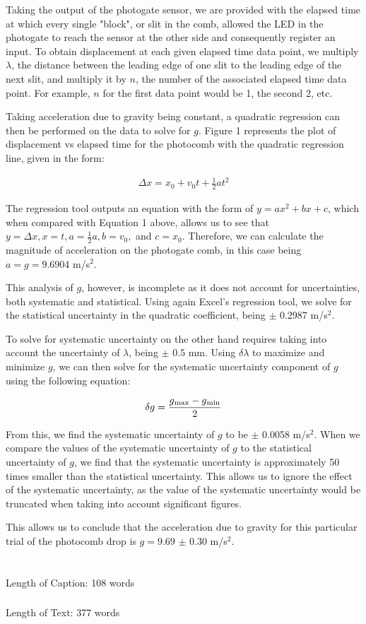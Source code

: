 \documentclass[titlepage]{article}
\begin{document}
Taking the output of the photogate sensor, we are provided with the elapsed time at which every single "block", or slit in the comb, allowed the LED in the photogate to reach the sensor at the other side and consequently register an input. To obtain displacement at each given elapsed time data point, we multiply $\lambda$, the distance between the leading edge of one slit to the leading edge of the next slit, and multiply it by $n$, the number of the associated elapsed time data point. For example, $n$ for the first data point would be 1, the second 2, etc.

Taking acceleration due to gravity being constant, a quadratic regression can then be performed on the data to solve for $g$. Figure 1 represents the plot of displacement vs elapsed time for the photocomb with the quadratic regression line, given in the form:

\begin{align}
     \Delta x = x_0+v_0t+\frac{1}{2}at^2
\end{align}

The regression tool outputs an equation with the form of $y = ax^2 + bx + c$, which when compared with Equation 1 above, allows us to see that $y = \Delta x, x = t, a = \frac{1}{2}a, b = v_0,$ and $c = x_0.$ Therefore, we can calculate the magnitude of acceleration on the photogate comb, in this case being $a = g = 9.6904$ m/s$^2$.

This analysis of $g$, however, is incomplete as it does not account for uncertainties, both systematic and statistical. Using again Excel's regression tool, we solve for the statistical uncertainty in the quadratic coefficient, being $\pm$ 0.2987 m/s$^2$. 

To solve for systematic uncertainty on the other hand requires taking into account the uncertainty of $\lambda$, being $\pm$ 0.5 mm. Using $\delta\lambda$ to maximize and minimize $g$, we can then solve for the systematic uncertainty component of $g$ using the following equation:

\begin{align}
     \delta g = \frac{g\textsubscript{max} - g\textsubscript{min}}{2}
\end{align}

From this, we find the systematic uncertainty of $g$ to be $\pm$ 0.0058 m/s$^2$. When we compare the values of the systematic uncertainty of $g$ to the statistical uncertainty of $g$, we find that the systematic uncertainty is approximately 50 times smaller than the statistical uncertainty. This allows us to ignore the effect of the systematic uncertainty, as the value of the systematic uncertainty would be truncated when taking into account significant figures.

This allows us to conclude that the acceleration due to gravity for this particular trial of the photocomb drop is $g = 9.69$ $\pm$ 0.30 m/s$^2$.

\section*{}
Length of Caption: 108 words
\subsubsection*{}
Length of Text: 377 words
\end{document}
